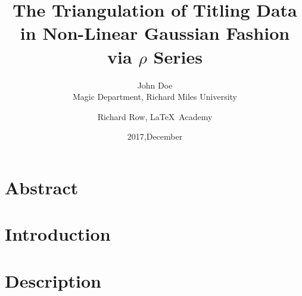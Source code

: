 \documentclass[12pt]{article}
\title{The Triangulation of Titling Data in Non-Linear Gaussian Fashion via $\rho$ Series}
\date{2017,December}
\author{John Doe\\ Magic Department, Richard Miles University 
\and Richard Row, \LaTeX\ Academy}
\begin{document}
\maketitle

\tableofcontents

\section*{Abstract}


\section{Introduction}


\section{Description}

\end{document}
